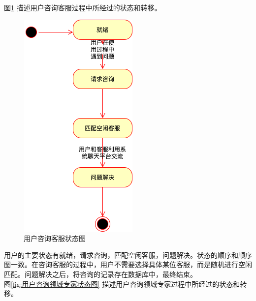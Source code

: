 \documentclass[a4paper]{ctexart}
\begin{document}
图\ref{fig:用户咨询客服状态图} 描述用户咨询客服过程中所经过的状态和转移。

\begin{figure}[H]
\centering
\includegraphics[scale=0.5]{image/3_5状态图.png}
\caption{用户咨询客服状态图}
\label{fig:用户咨询客服状态图}
\end{figure}
用户的主要状态有就绪，请求咨询，匹配空闲客服，问题解决。状态的顺序和顺序图一致。在咨询客服的过程中，用户不需要选择具体某位客服，而是随机进行空闲匹配。问题解决之后，将咨询的记录存在数据库中，最终结束。\\

图\ref{fig:用户咨询领域专家状态图} 描述用户咨询领域专家过程中所经过的状态和转移。
\end{document}
